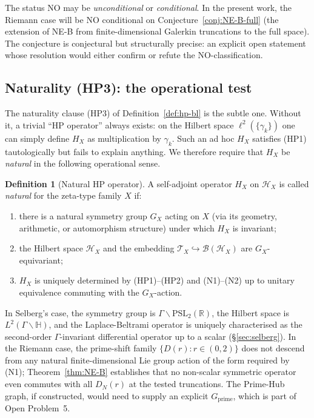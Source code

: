 \documentclass[11pt]{article}
\theoremstyle{definition}
\newtheorem{definition}[theorem]{Definition}
\theoremstyle{remark}
\newcommand{\PSL}{\mathrm{PSL}}
\begin{document}
The status $\mathrm{NO}$ may be \emph{unconditional} or
\emph{conditional}. In the present work, the Riemann case will be
$\mathrm{NO}$ conditional on Conjecture~\ref{conj:NE-B-full} (the
extension of NE-B from finite-dimensional Galerkin truncations to the
full space). The conjecture is conjectural but structurally precise: an explicit
open statement whose resolution would either confirm or refute the
NO-classification.

\subsection{Naturality (HP3): the operational test}

The naturality clause (HP3) of Definition~\ref{def:hp-bl} is the
subtle one. Without it, a trivial ``HP operator'' always exists: on
the Hilbert space $\ell^2(\{\gamma_k\})$ one can simply define $H_X$
as multiplication by $\gamma_k$. Such an ad hoc $H_X$ satisfies (HP1)
tautologically but fails to explain anything. We therefore require
that $H_X$ be \emph{natural} in the following operational sense.

\begin{definition}[Natural HP operator]\label{def:natural-hp}
A self-adjoint operator $H_X$ on $\mathcal{H}_X$ is called
\emph{natural} for the zeta-type family $X$ if:
\begin{enumerate}
\item[(N1)] there is a natural symmetry group $G_X$ acting on $X$
  (via its geometry, arithmetic, or automorphism structure) under
  which $H_X$ is invariant;
\item[(N2)] the Hilbert space $\mathcal{H}_X$ and the embedding
  $\mathcal{T}_X \hookrightarrow \mathcal{B}(\mathcal{H}_X)$ are
  $G_X$-equivariant;
\item[(N3)] $H_X$ is uniquely determined by (HP1)--(HP2) and (N1)--(N2)
  up to unitary equivalence commuting with the $G_X$-action.
\end{enumerate}
\end{definition}

In Selberg's case, the symmetry group is $\Gamma\backslash\PSL_2(\mathbb{R})$,
the Hilbert space is $L^2(\Gamma\backslash\mathbb{H})$, and the
Laplace-Beltrami operator is uniquely characterised as the
second-order $\Gamma$-invariant differential operator up to a scalar
(\S\ref{sec:selberg}). In the Riemann case, the prime-shift family
$\{D(r) : r \in (0,2)\}$ does not descend from any natural
finite-dimensional Lie group action of the form required by (N1);
Theorem~\ref{thm:NE-B} establishes that no non-scalar symmetric
operator even commutes with all $D_N(r)$ at the tested truncations.
The Prime-Hub graph, if constructed, would need to supply an explicit
$G_{\mathrm{prime}}$, which is part of Open Problem~5.
\end{document}

